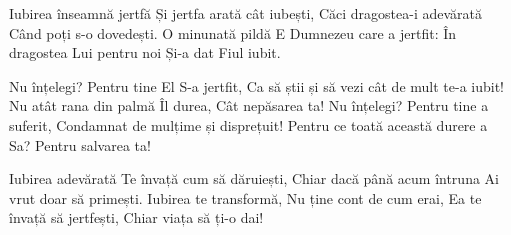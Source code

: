 \beginverse
Iubirea înseamnă jertfă
Și jertfa arată cât iubești,
Căci dragostea-i adevărată
Când poți s-o dovedești.
O minunată pildă
E Dumnezeu care a jertfit:
În dragostea Lui pentru noi
Și-a dat Fiul iubit.
\endverse

\beginchorus
Nu înțelegi? Pentru tine El S-a jertfit,
Ca să știi și să vezi cât de mult te-a iubit!
Nu atât rana din palmă Îl durea,
Cât nepăsarea ta!
Nu înțelegi? Pentru tine a suferit,
Condamnat de mulțime și disprețuit!
Pentru ce toată această durere a Sa?
Pentru salvarea ta!
\endchorus

\beginverse
Iubirea adevărată
Te învață cum să dăruiești,
Chiar dacă până acum întruna
Ai vrut doar să primești.
Iubirea te transformă,
Nu ține cont de cum erai,
Ea te învață să jertfești,
Chiar viața să ți-o dai!
\endverse
\endsong